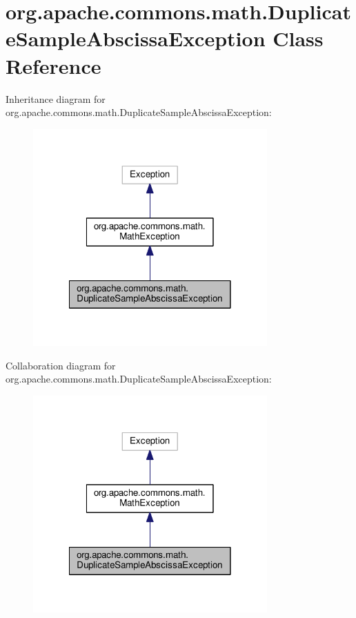 \section{org.\-apache.\-commons.\-math.\-Duplicate\-Sample\-Abscissa\-Exception Class Reference}
\label{classorg_1_1apache_1_1commons_1_1math_1_1_duplicate_sample_abscissa_exception}


Inheritance diagram for org.\-apache.\-commons.\-math.\-Duplicate\-Sample\-Abscissa\-Exception\-:
\nopagebreak
\begin{figure}[H]
\begin{center}
\leavevmode
\includegraphics[width=254pt]{classorg_1_1apache_1_1commons_1_1math_1_1_duplicate_sample_abscissa_exception__inherit__graph}
\end{center}
\end{figure}


Collaboration diagram for org.\-apache.\-commons.\-math.\-Duplicate\-Sample\-Abscissa\-Exception\-:
\nopagebreak
\begin{figure}[H]
\begin{center}
\leavevmode
\includegraphics[width=254pt]{classorg_1_1apache_1_1commons_1_1math_1_1_duplicate_sample_abscissa_exception__coll__graph}
\end{center}
\end{figure}
